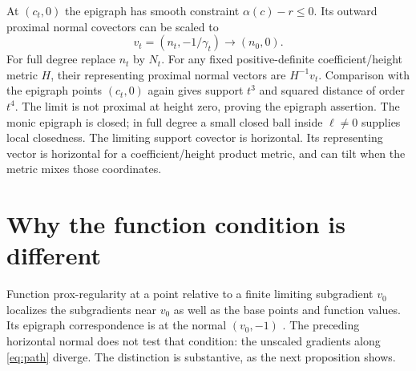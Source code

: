 \documentclass[11pt]{article}
\theoremstyle{remark}\newtheorem{remark}[theorem]{Remark}
\begin{document}
At $(c_t,0)$ the epigraph has smooth constraint $\alpha(c)-r\leq0$.
Its outward proximal normal covectors can be scaled to
\[
 v_t=(n_t,-1/\gamma_t)\longrightarrow(n_0,0).
\]
For full degree replace $n_t$ by $N_t$.
For any fixed positive-definite coefficient/height metric $H$, their
representing proximal normal vectors are $H^{-1}v_t$. Comparison with the
epigraph points $(c_t,0)$ again gives support $t^3$ and squared distance of
order $t^4$. The limit is not proximal at height zero, proving the epigraph
assertion. The monic epigraph is closed; in full degree a small closed ball
inside $\ell\ne0$ supplies local closedness. The limiting support covector is
horizontal. Its representing vector is horizontal for a coefficient/height
product metric, and can tilt when the metric mixes those coordinates.

\section{Why the function condition is different}
Function prox-regularity at a point relative to a finite limiting subgradient
$v_0$ localizes the subgradients near $v_0$ as well as the base points and
function values. Its epigraph correspondence is at the normal $(v_0,-1)$
\cite[Definition~1.1 and p.~205]{PR}. The preceding horizontal normal does
not test that condition: the unscaled gradients along \eqref{eq:path}
diverge. The distinction is substantive, as the next proposition shows.
\end{document}
